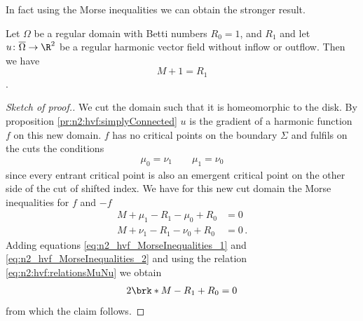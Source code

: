 In fact using the Morse inequalities we can obtain the stronger result.
\begin{proposition}
  Let $\Omega$ be a regular domain with Betti numbers $R_0=1$, and $R_1$ and let $u\colon\overline{\Omega}\to\R^2$ be 
  a regular harmonic vector field without inflow or outflow.
  Then we have $$M+1=R_1$$.
\end{proposition}
\begin{proof}[Sketch of proof.]
  We cut the domain such that it is homeomorphic to the disk. By proposition \ref{pr:n2:hvf:simplyConnected}
  $u$ is the gradient of a harmonic function $f$ on this new domain.
  $f$ has no critical points on the boundary $\Sigma$ and fulfils on the cuts the conditions
  \begin{align}
    \mu_0=\nu_1 \qquad \mu_1=\nu_0 \label{eq:n2:hvf:relationsMuNu}
  \end{align}
  since every entrant critical point is also an emergent critical point on the other side of the cut of shifted index.
  We have for this new cut domain the Morse inequalities for $f$ and $-f$
  \begin{align}
    M+\mu_1-R_1-\mu_0+R_0&=0 \label{eq:n2_hvf_MorseInequalities_1}\\
    M+\nu_1-R_1-\nu_0+R_0&=0\,. \label{eq:n2_hvf_MorseInequalities_2}
  \end{align}
  Adding equations \eqref{eq:n2_hvf_MorseInequalities_1} and \eqref{eq:n2_hvf_MorseInequalities_2} and using the relation
  \eqref{eq:n2:hvf:relationsMuNu} we obtain
  \begin{align*}
    2\brk*{M-R_1+R_0}=0
  \end{align*}
  from which the claim follows.
\end{proof}

